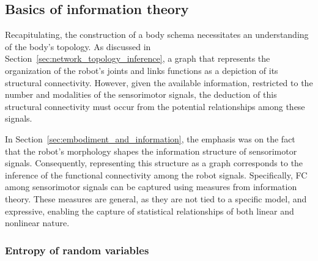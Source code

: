 \subsection{Basics of information theory}
Recapitulating, the construction of a body schema necessitates an understanding of the body's topology. As discussed in Section~\ref{sec:network_topology_inference}, a graph that represents the organization of the robot's joints and links functions as a depiction of its structural connectivity. However, given the available information, restricted to the number and modalities of the sensorimotor signals, the deduction of this structural connectivity must occur from the potential relationships among these signals.

In Section~\ref{sec:embodiment_and_information}, the emphasis was on the fact that the robot's morphology shapes the information structure of sensorimotor signals. Consequently, representing this structure as a graph corresponds to the inference of the functional connectivity among the robot signals. Specifically, FC among sensorimotor signals can be captured using measures from information theory\cite{Cover1999Elementsinformationtheory}. These measures are general, as they are not tied to a specific model, and expressive, enabling the capture of statistical relationships of both linear and nonlinear nature.

\subsubsection{Entropy of random variables}

